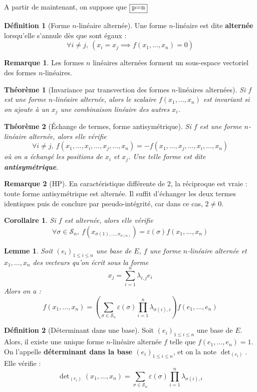\documentclass[french]{book}
\theoremstyle{plain}
\newtheorem{thm}{Théorème}[chapter]
\newtheorem{lem}{Lemme}[chapter]
\newtheorem{cor}{Corollaire}[chapter]
\theoremstyle{definition}
\newtheorem{dfn}{Définition}[chapter]
\newtheorem{rmq}{Remarque}[chapter]
\theoremstyle{remark}
\begin{document}
A partir de maintenant, on suppose que $\displaystyle\fbox{p=n}$
\begin{dfn}[Forme $n$-linéaire alternée]
	Une forme $n$-linéaire est dite \textbf{alternée} lorsqu'elle s'annule dès que sont égaux : $$\forall i\ne j,\ \left(x_i=x_j\implies f(x_1,\ldots,x_n)=0\right)$$
\end{dfn}
\begin{rmq} Les formes $n$ linéaires alternées forment un sous-espace vectoriel des formes $n$-linéaires. \end{rmq}
\begin{thm}[Invariance par transvection des formes $n$-linéaires alternées]
	Si $f$ est une forme $n$-linéaire alternée, alors le scalaire $f(x_1,\ldots,x_n)$ est invariant si on ajoute à un $x_j$ une combinaison linéaire des autres $x_i$.
\end{thm}
\begin{thm}[Échange de termes, forme antisymétrique]
	Si $f$ est une forme $n$-linéaire alternée, alors elle vérifie $$\forall i\ne j,\ f(x_1,\ldots,x_i,\ldots,x_j,\ldots,x_n)=-f(x_1,\ldots,x_j,\ldots,x_i,\ldots,x_n)$$ où on a échangé les positions de $x_i$ et $x_j$. Une telle forme est dite \textbf{antisymétrique}.
\end{thm}
\begin{rmq}[HP] En caractéristique différente de $2$, la réciproque est vraie : toute forme antisymétrique est alternée. Il suffit d'échanger les deux termes identiques puis de conclure par pseudo-intégrité, car dans ce cas, $2\ne 0$. \end{rmq}
\begin{cor}
	Si $f$ est alternée, alors elle vérifie $$\forall\sigma\in\mathcal{S}_n,\ f(x_{\sigma(1),\ldots,x_{\sigma(n)}})=\varepsilon(\sigma)f(x_1,\ldots,x_n)$$
\end{cor}
\begin{lem}
	Soit $(e_i)_{1\leqslant i\leqslant n}$ une base de $E$, $f$ une forme $n$-linéaire alternée et $x_1,\ldots,x_n$ des vecteurs qu'on écrit sous la forme $$x_j=\sum_{i=1}^{n}\lambda_{i,j}e_i$$ Alors on a : $$f(x_1,\ldots,x_n)=\left(\sum_{\sigma\in\mathcal{S}_n}\varepsilon(\sigma)\prod_{i=1}^{n}\lambda_{\sigma(i),i}\right)f(e_1,\ldots,e_n)$$
\end{lem}
\begin{dfn}[Déterminant dans une base]
	Soit $(e_i)_{1\leqslant i\leqslant n}$ une base de $E$. Alors, il existe une unique forme $n$-linéaire alternée $f$ telle que $f(e_1,\ldots,e_n)=1$. On l'appelle \textbf{déterminant dans la base $(e_i)_{1\leqslant i\leqslant n}$}, et on la note $\det\nolimits_{(e_i)}$. Elle vérifie :$$\det\nolimits_{(e_i)}(x_1,\ldots,x_n)=\sum_{\sigma\in\mathcal{S}_n}\varepsilon(\sigma)\prod_{i=1}^{n}\lambda_{\sigma(i),i}$$
\end{dfn}
\end{document}

